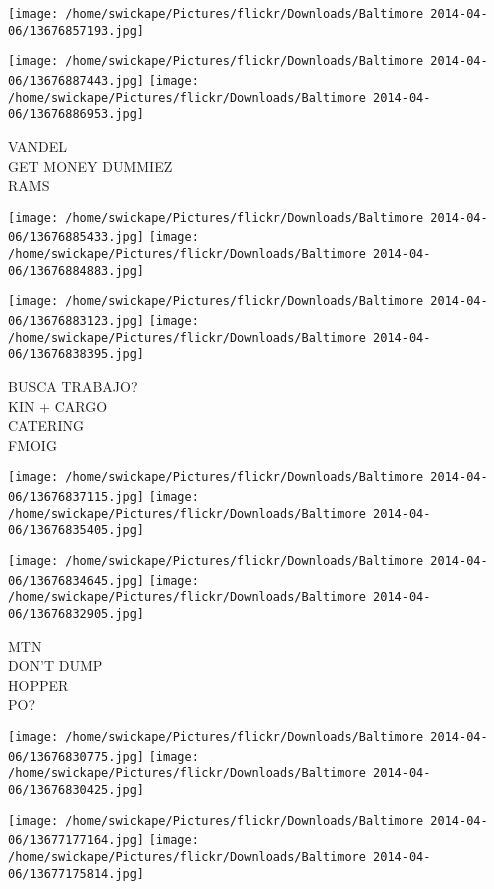 \documentclass[10pt,letterpaper]{article}
\begin{document}
\texttt{[image: /home/swickape/Pictures/flickr/Downloads/Baltimore 2014-04-06/13676857193.jpg]}

\vspace{0.25in}
\texttt{[image: /home/swickape/Pictures/flickr/Downloads/Baltimore 2014-04-06/13676887443.jpg]}
\texttt{[image: /home/swickape/Pictures/flickr/Downloads/Baltimore 2014-04-06/13676886953.jpg]}

VANDEL\\
GET MONEY DUMMIEZ\\
RAMS\\
\pagebreak

\texttt{[image: /home/swickape/Pictures/flickr/Downloads/Baltimore 2014-04-06/13676885433.jpg]}
\texttt{[image: /home/swickape/Pictures/flickr/Downloads/Baltimore 2014-04-06/13676884883.jpg]}

\texttt{[image: /home/swickape/Pictures/flickr/Downloads/Baltimore 2014-04-06/13676883123.jpg]}
\texttt{[image: /home/swickape/Pictures/flickr/Downloads/Baltimore 2014-04-06/13676838395.jpg]}

BUSCA TRABAJO?\\
KIN + CARGO\\
CATERING\\
FMOIG\\
\pagebreak

\texttt{[image: /home/swickape/Pictures/flickr/Downloads/Baltimore 2014-04-06/13676837115.jpg]}
\texttt{[image: /home/swickape/Pictures/flickr/Downloads/Baltimore 2014-04-06/13676835405.jpg]}

\texttt{[image: /home/swickape/Pictures/flickr/Downloads/Baltimore 2014-04-06/13676834645.jpg]}
\texttt{[image: /home/swickape/Pictures/flickr/Downloads/Baltimore 2014-04-06/13676832905.jpg]}

MTN\\
DON'T DUMP\\
HOPPER\\
PO?\\
\pagebreak

\texttt{[image: /home/swickape/Pictures/flickr/Downloads/Baltimore 2014-04-06/13676830775.jpg]}
\texttt{[image: /home/swickape/Pictures/flickr/Downloads/Baltimore 2014-04-06/13676830425.jpg]}

\texttt{[image: /home/swickape/Pictures/flickr/Downloads/Baltimore 2014-04-06/13677177164.jpg]}
\texttt{[image: /home/swickape/Pictures/flickr/Downloads/Baltimore 2014-04-06/13677175814.jpg]}
\end{document}

